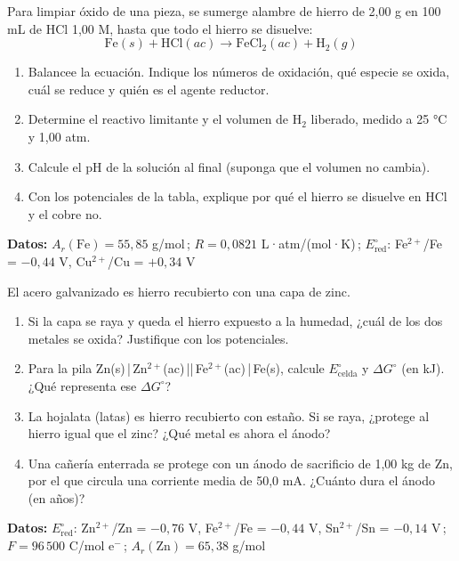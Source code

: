 \documentclass[11pt]{article}
\newcommand{\ejercicio}[1]{\par\vspace{10pt}{\large\bfseries\color{NavyBlue}Ejercicio #1}\par
  \nointerlineskip\vspace{2pt}{\color{NavyBlue!40}\rule{\linewidth}{0.4pt}}\par\vspace{2pt}}
\begin{document}
\newpage
\ejercicio{6}
Para limpiar óxido de una pieza, se sumerge alambre de hierro de 2,00 g en 100 mL de HCl 1,00 M, hasta que todo el hierro se disuelve:
\[\text{Fe}(s) + \text{HCl}(ac) \rightarrow \text{FeCl}_2(ac) + \text{H}_2(g)\]
\begin{enumerate}
\item Balancee la ecuación. Indique los números de oxidación, qué especie se oxida, cuál se reduce y quién es el agente reductor.
\item Determine el reactivo limitante y el volumen de H\(_2\) liberado, medido a 25 °C y 1,00 atm.
\item Calcule el pH de la solución al final (suponga que el volumen no cambia).
\item Con los potenciales de la tabla, explique por qué el hierro se disuelve en HCl y el cobre no.
\end{enumerate}
\begin{datos}
\textbf{Datos:} \(A_r(\text{Fe}) = 55{,}85\) g/mol\,; \(R = 0{,}0821\) L·atm/(mol·K)\,; \(E^\circ_{\text{red}}\): Fe\(^{2+}\)/Fe = \(-0{,}44\) V, Cu\(^{2+}\)/Cu = \(+0{,}34\) V
\end{datos}

\ejercicio{7}
El acero galvanizado es hierro recubierto con una capa de zinc.
\begin{enumerate}
\item Si la capa se raya y queda el hierro expuesto a la humedad, ¿cuál de los dos metales se oxida? Justifique con los potenciales.
\item Para la pila Zn(s)\,|\,Zn\(^{2+}\)(ac)\,||\,Fe\(^{2+}\)(ac)\,|\,Fe(s), calcule \(E^\circ_{\text{celda}}\) y \(\Delta G^\circ\) (en kJ). ¿Qué representa ese \(\Delta G^\circ\)?
\item La hojalata (latas) es hierro recubierto con estaño. Si se raya, ¿protege al hierro igual que el zinc? ¿Qué metal es ahora el ánodo?
\item Una cañería enterrada se protege con un ánodo de sacrificio de 1,00 kg de Zn, por el que circula una corriente media de 50,0 mA. ¿Cuánto dura el ánodo (en años)?
\end{enumerate}
\begin{datos}
\textbf{Datos:} \(E^\circ_{\text{red}}\): Zn\(^{2+}\)/Zn = \(-0{,}76\) V, Fe\(^{2+}\)/Fe = \(-0{,}44\) V, Sn\(^{2+}\)/Sn = \(-0{,}14\) V\,; \(F = 96\,500\) C/mol e\(^-\)\,; \(A_r(\text{Zn}) = 65{,}38\) g/mol
\end{datos}
\end{document}
